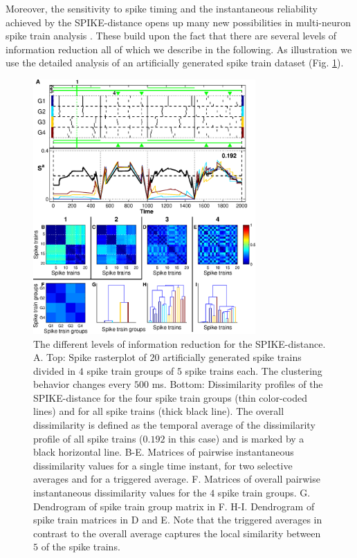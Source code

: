 \documentclass[10pt,twocolumn]{elsart5p}
\begin{document}
Moreover, the sensitivity to spike timing and the instantaneous reliability achieved by the SPIKE-distance opens up many new possibilities in multi-neuron spike train analysis \citep{Kreuz13}. These build upon the fact that there are several levels of information reduction all of which we describe in the following. As illustration we use the detailed analysis of an artificially generated spike train dataset (Fig. \ref{fig:Fig2-SPIKE-Representations}).
%
%
\begin{figure}
    \includegraphics[width=85mm]{Fig2_SPIKE_Representations.eps}
    \caption{\abb\label{fig:Fig2-SPIKE-Representations} The different levels of information reduction for the SPIKE-distance.  A. Top: Spike rasterplot of $20$ artificially generated spike trains divided in $4$ spike train groups of $5$ spike trains each. The clustering behavior changes every $500$ ms. Bottom: Dissimilarity profiles of the SPIKE-distance for the four spike train groups (thin color-coded lines) and for all spike trains (thick black line). The overall dissimilarity is defined as the temporal average of the dissimilarity profile of all spike trains ($0.192$ in this case) and is marked by a black horizontal line.  B-E. Matrices of pairwise instantaneous dissimilarity values for a single time instant, for two selective averages and for a triggered average.  F. Matrices of overall pairwise instantaneous dissimilarity values for the $4$ spike train groups.  G. Dendrogram of spike train group matrix in F.  H-I. Dendrogram of spike train matrices in D and E. Note that the triggered averages in contrast to the overall average captures the local similarity between $5$ of the spike trains.}
\end{figure}
\end{document}
